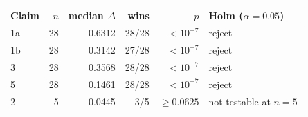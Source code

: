 \begin{tabular}{lrrrrl}
\toprule
Claim & $n$ & median $\Delta$ & wins & $p$ & Holm ($\alpha = 0.05$) \\
\midrule
1a & 28 & 0.6312 & 28/28 & $< 10^{-7}$ & reject \\
1b & 28 & 0.3142 & 27/28 & $< 10^{-7}$ & reject \\
3 & 28 & 0.3568 & 28/28 & $< 10^{-7}$ & reject \\
5 & 28 & 0.1461 & 28/28 & $< 10^{-7}$ & reject \\
2 & 5 & 0.0445 & 3/5 & $\geq 0.0625$ & not testable at $n = 5$ \\
\bottomrule
\end{tabular}
